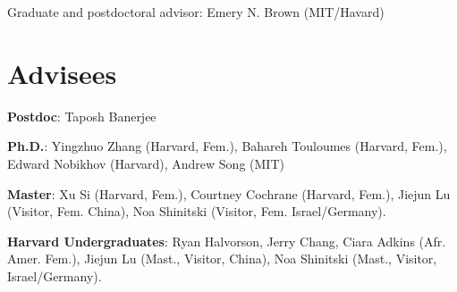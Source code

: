 \documentclass[11pt]{article}
\def\HCode#1{}
\renewenvironment{itemize}{
  \begin{list}{}{
    \setlength{\itemsep}{0.25em}
    \setlength{\parskip}{0pt}
    \setlength{\parsep}{0.25em}
  }
}{
  \end{list}
}
\begin{document}
\begin{itemize}
	\item[] Graduate and postdoctoral advisor: Emery N. Brown (MIT/Havard)
\end{itemize}

\section*{Advisees}

\begin{itemize}

	\item \textbf{Postdoc}: Taposh Banerjee
	\item \textbf{Ph.D.}: Yingzhuo Zhang (Harvard, Fem.), Bahareh Touloumes (Harvard, Fem.), Edward Nobikhov (Harvard), Andrew Song (MIT)
	\item \textbf{Master}: Xu Si (Harvard, Fem.), Courtney Cochrane (Harvard, Fem.), Jiejun Lu (Visitor, Fem. China), Noa Shinitski (Visitor, Fem. Israel/Germany).
	\item \textbf{Harvard Undergraduates}: Ryan Halvorson, Jerry Chang, Ciara Adkins (Afr. Amer. Fem.), Jiejun Lu (Mast., Visitor, China), Noa Shinitski (Mast., Visitor, Israel/Germany).

\end{itemize}


%


\vfill



\HCode{</div>} %
\HCode{</div>} %
\HCode{</div>} %
\end{document}
